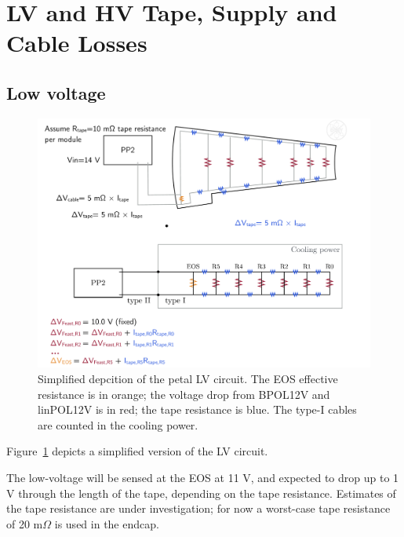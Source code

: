 
\section{LV and HV Tape, Supply and Cable Losses}

\subsection{Low voltage}
\label{low_voltage}

\begin{figure}[ht!]
\begin{center}
\includegraphics[width=0.74\linewidth]{figures/LV_cartoon.pdf}
\end{center}
\caption{Simplified depcition of the petal LV circuit. The EOS effective resistance is in orange;
the voltage drop from BPOL12V and linPOL12V is in red; the tape resistance is blue.
The type-I cables are counted in the cooling power.}
\label{lv_circuit}
\end{figure}

Figure~\ref{lv_circuit} depicts a simplified version of the LV circuit.



The low-voltage will be sensed at the EOS at 11 V, and expected to drop up to 1 V through the length of
the tape, depending on the tape resistance. Estimates of the tape resistance are under investigation;
for now a worst-case tape resistance of 20 m$\Omega$ is used in the endcap.

